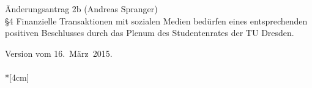 Änderungsantrag 2b (Andreas Spranger)\\
§4 Finanzielle Transaktionen mit sozialen Medien bedürfen eines entsprechenden positiven Beschlusses durch das Plenum des Studentenrates der TU Dresden.

\nopagebreak
\vspace{1cm}
Version vom 16.~März~2015.
\\



\normalsize
~\\*[4cm]
\begin{center}
\hspace*{\fill}
\hspace*{\fill}
\end{center}
